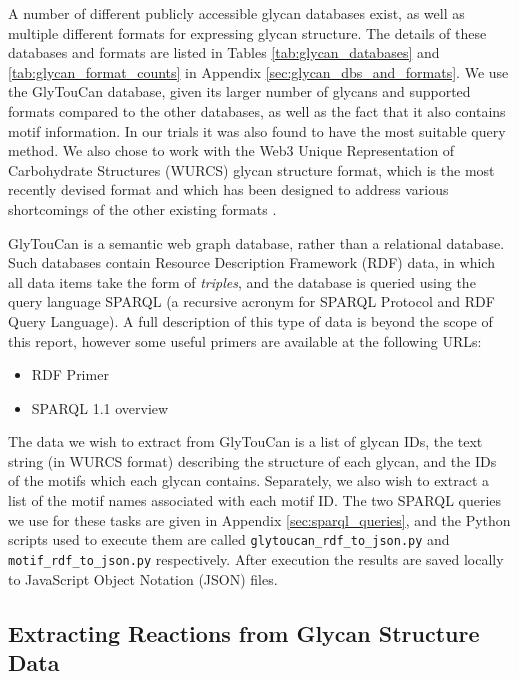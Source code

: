 \documentclass[12pt,a4paper]{article}
\begin{document}
A number of different publicly accessible glycan databases exist, as well as multiple different formats for expressing glycan structure. The details of these databases and formats are listed in Tables \ref{tab:glycan_databases} and \ref{tab:glycan_format_counts} in Appendix \ref{sec:glycan_dbs_and_formats}. We use the GlyTouCan database, given its larger number of glycans and supported formats compared to the other databases, as well as the fact that it also contains motif information. In our trials it was also found to have the most suitable query method. We also chose to work with the Web3 Unique Representation of Carbohydrate Structures (WURCS) glycan structure format, which is the most recently devised format and which has been designed to address various shortcomings of the other existing formats \citep{matsubara2017wurcs}.

GlyTouCan is a semantic web graph database, rather than a relational database. Such databases contain Resource Description Framework (RDF) data, in which all data items take the form of \emph{triples}, and the database is queried using the query language SPARQL (a recursive acronym for SPARQL Protocol and RDF Query Language). A full description of this type of data is beyond the scope of this report, however some useful primers are available at the following URLs:

\singlespace
\begin{itemize}
\item RDF Primer 
\item SPARQL 1.1 overview 
\end{itemize}
\doublespace

The data we wish to extract from GlyTouCan is a list of glycan IDs, the text string (in WURCS format) describing the structure of each glycan, and the IDs of the motifs which each glycan contains. Separately, we also wish to extract a list of the motif names associated with each motif ID. The two SPARQL queries we use for these tasks are given in Appendix \ref{sec:sparql_queries}, and the Python scripts used to execute them are called \texttt{glytoucan\_rdf\_to\_json.py} and \texttt{motif\_rdf\_to\_json.py} respectively. After execution the results are saved locally to JavaScript Object Notation (JSON) files.

\subsection{Extracting Reactions from Glycan Structure Data}
\label{sec:extracting_reactions}
\end{document}
